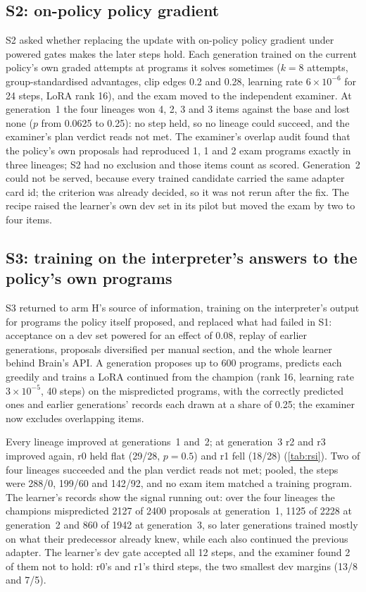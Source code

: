 \subsection{S2: on-policy policy gradient}\label{sec:rsi2}

S2 asked whether replacing the update with on-policy policy gradient under powered gates makes the
later steps hold. Each generation trained on the current policy's own graded attempts at programs it
solves sometimes ($k=8$ attempts, group-standardised advantages, clip edges 0.2 and 0.28, learning
rate $6\times10^{-6}$ for 24 steps, LoRA rank 16), and the exam moved to the independent
examiner. At generation~1 the four lineages won 4, 2, 3 and 3 items against the base and
lost none ($p$ from 0.0625 to 0.25): no step held, so no lineage could succeed, and the examiner's
plan verdict reads not met. The examiner's overlap audit found that the policy's own
proposals had reproduced 1, 1 and 2 exam programs exactly in three lineages; S2 had no exclusion
and those items count as scored. Generation~2 could not be served, because every trained
candidate carried the same adapter card id; the criterion was already decided, so it was not rerun
after the fix. The recipe raised the learner's own dev set in its pilot but moved the exam by
two to four items.

\subsection{S3: training on the interpreter's answers to the policy's own programs}\label{sec:rsi3}

S3 returned to arm H's source of information, training on the interpreter's output for programs the
policy itself proposed, and replaced what had failed in S1: acceptance on a dev set powered for an
effect of 0.08, replay of earlier generations, proposals diversified per manual section, and the whole
learner behind Brain's API. A generation proposes up to 600 programs, predicts each greedily and
trains a LoRA continued from the champion (rank 16, learning rate $3\times10^{-5}$, 40 steps) on the
mispredicted programs, with the correctly predicted ones and earlier generations' records each drawn
at a share of 0.25; the examiner now excludes overlapping items.

Every lineage improved at generations~1 and~2; at generation~3 r2 and r3 improved again, r0 held
flat (29/28, $p=0.5$) and r1 fell (18/28) (\cref{tab:rsi}). Two of four lineages succeeded and the
plan verdict reads not met; pooled, the steps were 288/0, 199/60 and 142/92, and no exam item matched a
training program. The learner's records show the signal running out: over the four
lineages the champions mispredicted 2127 of 2400 proposals at generation~1, 1125 of 2228 at
generation~2 and 860 of 1942 at generation~3, so later generations trained mostly on what their
predecessor already knew, while each also continued the previous adapter. The learner's dev
gate accepted all 12 steps, and the examiner found 2 of them not to hold: r0's and r1's third steps,
the two smallest dev margins (13/8 and 7/5).


